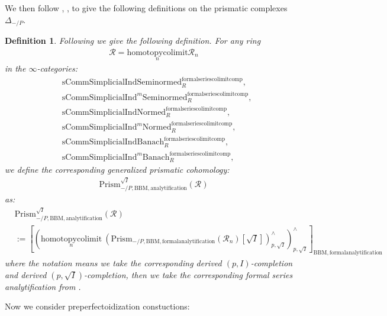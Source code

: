 \documentclass[12pt]{book}
\newtheorem{definition}{Definition}
\begin{document}
\indent We then follow \cite{BS}, \cite{BL}, \cite{Dr1} to give the following definitions on the prismatic complexes $\Delta_{-/P}$.



\begin{definition}
Following \cite[Construction 7.6]{BS} we give the following definition. For any ring
\begin{align}
\mathcal{R}=\underset{n}{\mathrm{homotopycolimit}}\mathcal{R}_n	
\end{align}
in the $\infty$-categories:
\begin{align}
&\mathrm{sComm}\mathrm{Simplicial}\mathrm{Ind}\mathrm{Seminormed}^\mathrm{formalseriescolimitcomp}_R,\\
&\mathrm{sComm}\mathrm{Simplicial}\mathrm{Ind}^m\mathrm{Seminormed}^\mathrm{formalseriescolimitcomp}_R,\\
&\mathrm{sComm}\mathrm{Simplicial}\mathrm{Ind}\mathrm{Normed}^\mathrm{formalseriescolimitcomp}_R,\\
&\mathrm{sComm}\mathrm{Simplicial}\mathrm{Ind}^m\mathrm{Normed}^\mathrm{formalseriescolimitcomp}_R,\\
&\mathrm{sComm}\mathrm{Simplicial}\mathrm{Ind}\mathrm{Banach}^\mathrm{formalseriescolimitcomp}_R,\\
&\mathrm{sComm}\mathrm{Simplicial}\mathrm{Ind}^m\mathrm{Banach}^\mathrm{formalseriescolimitcomp}_R,	
\end{align}	
we define the corresponding generalized prismatic cohomology:
\begin{align}
\mathrm{Prism}^{\sqrt{I}}_{-/P,\mathrm{BBM},\mathrm{analytification}}(\mathcal{R})
\end{align}
as:
\begin{align}
&\mathrm{Prism}^{\sqrt{I}}_{-/P,\mathrm{BBM},\mathrm{analytification}}(\mathcal{R})\\
&:=\left[\left(\underset{n}{\mathrm{homotopycolimit}}~ (\mathrm{Prism}_{-/P,\mathrm{BBM},\mathrm{formalanalytification}}(\mathcal{R}_n)[\sqrt{I}])^\wedge_{p,\sqrt{I}}\right)^\wedge_{p,\sqrt{I}}\right]_{\mathrm{BBM},\mathrm{formalanalytification}}	
\end{align}
where the notation means we take the corresponding derived $(p,I)$-completion and derived $(p,\sqrt{I})$-completion, then we take the corresponding formal series analytification from \cite[4.2]{BBM}.\\
\end{definition}

\indent Now we consider preperfectoidization constuctions:
\end{document}
